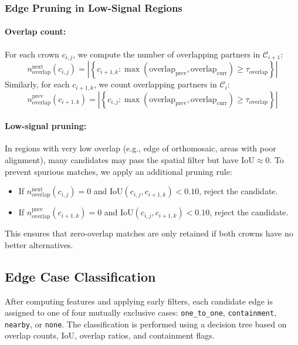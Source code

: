 \subsubsection{Edge Pruning in Low-Signal Regions}

\paragraph{Overlap count:} For each crown $c_{i,j}$, we compute the number of overlapping partners in $\mathcal{C}_{i+1}$:
\[
n_{\text{overlap}}^{\text{next}}(c_{i,j}) = \left|\left\{c_{i+1,k} : \max(\text{overlap}_{\text{prev}}, \text{overlap}_{\text{curr}}) \geq \tau_{\text{overlap}}\right\}\right|
\]
Similarly, for each $c_{i+1,k}$, we count overlapping partners in $\mathcal{C}_i$:
\[
n_{\text{overlap}}^{\text{prev}}(c_{i+1,k}) = \left|\left\{c_{i,j} : \max(\text{overlap}_{\text{prev}}, \text{overlap}_{\text{curr}}) \geq \tau_{\text{overlap}}\right\}\right|
\]

\paragraph{Low-signal pruning:} In regions with very low overlap (e.g., edge of orthomosaic, areas with poor alignment), many candidates may pass the spatial filter but have $\text{IoU} \approx 0$. To prevent spurious matches, we apply an additional pruning rule:
\begin{itemize}
    \item If $n_{\text{overlap}}^{\text{next}}(c_{i,j}) = 0$ and $\text{IoU}(c_{i,j}, c_{i+1,k}) < 0.10$, reject the candidate.
    \item If $n_{\text{overlap}}^{\text{prev}}(c_{i+1,k}) = 0$ and $\text{IoU}(c_{i,j}, c_{i+1,k}) < 0.10$, reject the candidate.
\end{itemize}
This ensures that zero-overlap matches are only retained if both crowns have no better alternatives.

\subsection{Edge Case Classification}
\label{sec:case_classification}

After computing features and applying early filters, each candidate edge is assigned to one of four mutually exclusive cases: \texttt{one\_to\_one}, \texttt{containment}, \texttt{nearby}, or \texttt{none}. The classification is performed using a decision tree based on overlap counts, IoU, overlap ratios, and containment flags.


